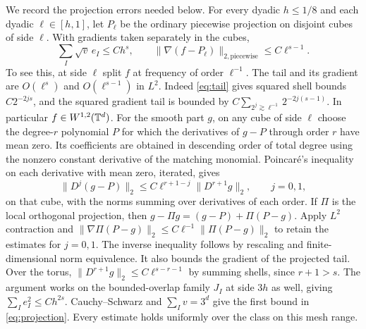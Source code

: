 We record the projection errors needed below. For every dyadic
\(h\le1/8\) and each dyadic \(\ell\in[h,1]\), let \(P_\ell\) be the
ordinary piecewise projection on disjoint cubes of side \(\ell\).
With gradients taken separately in the cubes,
\begin{equation}\label{eq:projection}
 \sum_I\sqrt v\,e_I\le C h^s,\qquad
 \|\nabla(f-P_\ell)\|_{2,\mathrm{piecewise}}\le C\ell^{s-1}.
\end{equation}
To see this, at side \(\ell\) split \(f\) at frequency of order
\(\ell^{-1}\). The tail and its gradient are \(O(\ell^s)\) and
\(O(\ell^{s-1})\) in \(L^2\). Indeed \eqref{eq:tail}
gives squared shell bounds \(C2^{-2js}\), and the
squared gradient tail is bounded by
\(C\sum_{2^j\gtrsim \ell^{-1}} 2^{-2j(s-1)}\).
In particular \(f\in W^{1,2}(\mathbb T^d)\). For the smooth
part \(g\), on any cube of side \(\ell\) choose the degree-\(r\)
polynomial \(P\) for which the derivatives of \(g-P\) through
order \(r\) have mean zero. Its coefficients are obtained in
descending order of total degree using the nonzero constant
derivative of the matching monomial. Poincaré's inequality on
each derivative with mean zero, iterated, gives
\[
 \|D^j(g-P)\|_2\le C\ell^{r+1-j}\|D^{r+1}g\|_2,\qquad j=0,1 ,
\]
on that cube, with the norms summing over derivatives of each order.
If \(\Pi\) is the local orthogonal projection, then
\(g-\Pi g=(g-P)+\Pi(P-g)\). Apply \(L^2\) contraction and
\(\|\nabla \Pi(P-g)\|_2\le C\ell^{-1}\|\Pi(P-g)\|_2\)
to retain the estimates for \(j=0,1\). The inverse inequality
follows by rescaling and finite-dimensional norm equivalence.
It also bounds the gradient of the projected tail. Over the torus,
\(\|D^{r+1}g\|_2\le C\ell^{s-r-1}\) by summing shells, since
\(r+1>s\). The argument works on the bounded-overlap family
\(J_I\) at side \(3h\) as well, giving
\(\sum_I e_I^2\le C h^{2s}\). Cauchy--Schwarz and
\(\sum_I v=3^d\) give the first bound in \eqref{eq:projection}.
Every estimate holds uniformly over the class on this mesh range.

